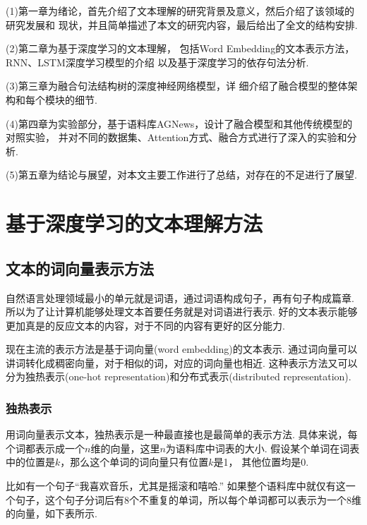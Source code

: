 \documentclass[bachelor,winfonts]{jnuthesis}
\begin{document}
(1)第一章为绪论，首先介绍了文本理解的研究背景及意义，然后介绍了该领域的研究发展和 现状，并且简单描述了本文的研究内容，最后给出了全文的结构安排.

(2)第二章为基于深度学习的文本理解，
包括Word Embedding的文本表示方法，RNN、LSTM深度学习模型的介绍
以及基于深度学习的依存句法分析.

(3)第三章为融合句法结构树的深度神经网络模型，详
细介绍了融合模型的整体架构和每个模块的细节.

(4)第四章为实验部分，基于语料库AGNews，设计了融合模型和其他传统模型的对照实验，
并对不同的数据集、Attention方式、融合方式进行了深入的实验和分析.

(5)第五章为结论与展望，对本文主要工作进行了总结，对存在的不足进行了展望.


\chapter{基于深度学习的文本理解方法}
\section{文本的词向量表示方法}
自然语言处理领域最小的单元就是词语，通过词语构成句子，再有句子构成篇章.
所以为了让计算机能够处理文本首要任务就是对词语进行表示.
好的文本表示能够更加真是的反应文本的内容，对于不同的内容有更好的区分能力.

现在主流的表示方法是基于词向量(word embedding)的文本表示.
通过词向量可以讲词转化成稠密向量，对于相似的词，对应的词向量也相近.
这种表示方法又可以分为独热表示(one-hot representation)和分布式表示(distributed representation).

\subsection{独热表示}
用词向量表示文本，独热表示是一种最直接也是最简单的表示方法.
具体来说，每个词都表示成一个$n$维的向量，这里$n$为语料库中词表的大小.
假设某个单词在词表中的位置是$k$，那么这个单词的词向量只有位置$k$是1，
其他位置均是0.

比如有一个句子“我喜欢音乐，尤其是摇滚和嘻哈.”
如果整个语料库中就仅有这一个句子，这个句子分词后有8个不重复的单词，所以每个单词都可以表示为一个8维的向量，如下表所示.
\end{document}
